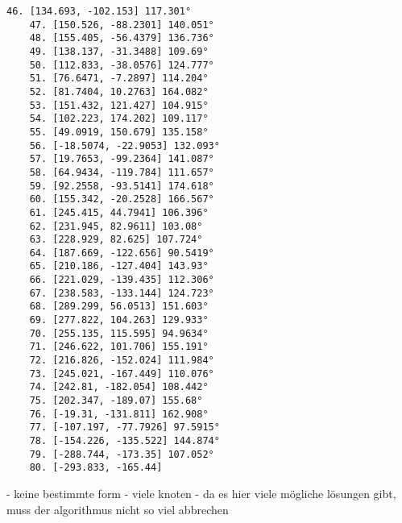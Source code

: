 \documentclass[a4paper,10pt,ngerman]{scrartcl}
\begin{document}
\begin{lstlisting}[frame=single, title=Programmausgabe wenigerkrumm6.txt, breaklines=true,label={lst:lstlisting4}]
    46. [134.693, -102.153] 117.301°
    47. [150.526, -88.2301] 140.051°
    48. [155.405, -56.4379] 136.736°
    49. [138.137, -31.3488] 109.69°
    50. [112.833, -38.0576] 124.777°
    51. [76.6471, -7.2897] 114.204°
    52. [81.7404, 10.2763] 164.082°
    53. [151.432, 121.427] 104.915°
    54. [102.223, 174.202] 109.117°
    55. [49.0919, 150.679] 135.158°
    56. [-18.5074, -22.9053] 132.093°
    57. [19.7653, -99.2364] 141.087°
    58. [64.9434, -119.784] 111.657°
    59. [92.2558, -93.5141] 174.618°
    60. [155.342, -20.2528] 166.567°
    61. [245.415, 44.7941] 106.396°
    62. [231.945, 82.9611] 103.08°
    63. [228.929, 82.625] 107.724°
    64. [187.669, -122.656] 90.5419°
    65. [210.186, -127.404] 143.93°
    66. [221.029, -139.435] 112.306°
    67. [238.583, -133.144] 124.723°
    68. [289.299, 56.0513] 151.603°
    69. [277.822, 104.263] 129.933°
    70. [255.135, 115.595] 94.9634°
    71. [246.622, 101.706] 155.191°
    72. [216.826, -152.024] 111.984°
    73. [245.021, -167.449] 110.076°
    74. [242.81, -182.054] 108.442°
    75. [202.347, -189.07] 155.68°
    76. [-19.31, -131.811] 162.908°
    77. [-107.197, -77.7926] 97.5915°
    78. [-154.226, -135.522] 144.874°
    79. [-288.744, -173.35] 107.052°
    80. [-293.833, -165.44]
    \end{lstlisting}

    - keine bestimmte form
    - viele knoten
    - da es hier viele mögliche lösungen gibt, muss der algorithmus nicht so viel abbrechen
\end{document}
